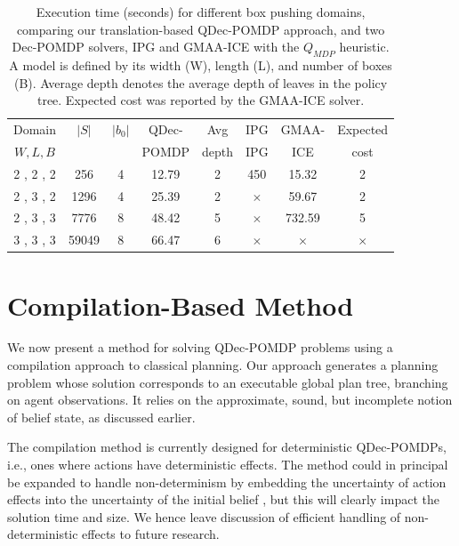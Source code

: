 \documentclass[letterpaper]{article}
\theoremstyle{definition}
\begin{document}
\begin{table}[t]
\centering
\caption{\small{Execution time (seconds) for different box pushing domains, comparing our translation-based QDec-POMDP approach, and two Dec-POMDP solvers, IPG and GMAA-ICE with the $Q_{MDP}$ heuristic.
A model is defined by its width (W), length (L), and number of boxes (B). Average depth denotes the average depth of leaves in the policy tree. Expected cost was reported by the GMAA-ICE solver.
}}
\small
\begin{tabular}{|c|c|c||c|c|c|c|c|}
\hline
Domain & $|S|$ & $|b_0|$ & QDec- & Avg & IPG & GMAA- & Expected \\
$W,L,B$ &  &  & POMDP & depth & IPG & ICE & cost \\
\hline
 2 , 2 , 2 & 256 & 4 & 12.79 & 2 & 450 & 15.32 & 2 \\
 2 , 3 , 2 & 1296 & 4 & 25.39 & 2 & $\times$ & 59.67 & 2  \\
 2 , 3 , 3 & 7776 & 8 & 48.42 & 5 & $\times$ & 732.59 & 5 \\
 3 , 3 , 3 & 59049 & 8 & 66.47 & 6 & $\times$ & $\times$ & $\times$ \\
\hline
\end{tabular}
\label{tbl:Results}
\end{table}




\section{Compilation-Based Method}

We now present a method for solving QDec-POMDP problems using a compilation approach to classical planning. Our approach generates a planning problem whose solution corresponds to an executable global plan tree, branching on agent observations. It relies on the approximate, sound, but incomplete notion of belief state, as discussed earlier.

The compilation method is currently designed for deterministic QDec-POMDPs, i.e., ones where actions have deterministic effects. The method could in principal be expanded to handle non-determinism by embedding the uncertainty of action effects into the uncertainty of the initial belief \cite{Yoon}, but this will clearly impact the solution time and size.  We hence leave discussion of efficient handling of non-deterministic effects to future research.
\end{document}
